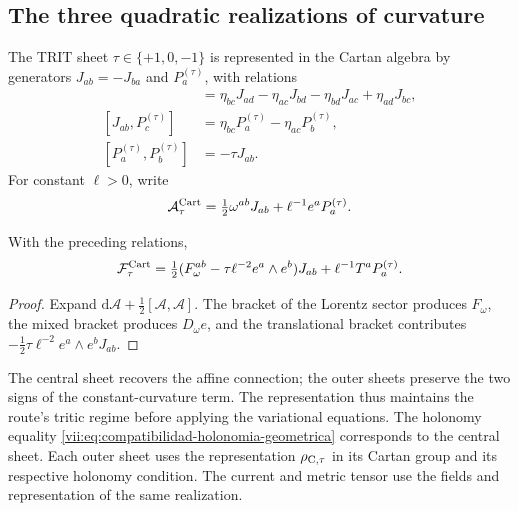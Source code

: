 \subsection{The three quadratic realizations of curvature}

The TRIT sheet \(\tau\in\{+1,0,-1\}\) is represented in
the Cartan algebra by generators \(J_{ab}=-J_{ba}\)
and \(P_a^{(\tau)}\), with relations
\begin{align*}
 [J_{ab},J_{cd}]&=
 \eta_{bc}J_{ad}-\eta_{ac}J_{bd}
 -\eta_{bd}J_{ac}+\eta_{ad}J_{bc},\\
 [J_{ab},P_c^{(\tau)}]&=
 \eta_{bc}P_a^{(\tau)}-\eta_{ac}P_b^{(\tau)},\\
 [P_a^{(\tau)},P_b^{(\tau)}]&=-\tau J_{ab}.
\end{align*}
For constant \(\ell>0\), write
\[
 \mathcal A_\tau^{\rm Cart}
 =\tfrac12\omega^{ab}J_{ab}+\ell^{-1}e^aP_a^{(\tau)}.
\]

\begin{proposition}
\label{vii:prop:curvatura-tritificada}
With the preceding relations,
\begin{equation}
 \mathcal F_\tau^{\rm Cart}
 =\tfrac12(F_\omega^{ab}-\tau\ell^{-2}e^a\wedge e^b)J_{ab}
     +\ell^{-1}T^aP_a^{(\tau)}.
 \label{vii:eq:curvatura-tritificada}
\end{equation}
\end{proposition}
\begin{proof}
Expand \(\mathrm d\mathcal A+\tfrac12[\mathcal A,\mathcal A]\).
The bracket of the Lorentz sector produces \(F_\omega\), the
mixed bracket produces \(D_\omega e\), and the translational bracket contributes
\(-\tfrac12\tau\ell^{-2}e^a\wedge e^bJ_{ab}\).
\end{proof}

The central sheet recovers the affine connection; the outer sheets
preserve the two signs of the constant-curvature term.
The representation thus maintains the route's tritic regime before
applying the variational equations. The holonomy equality
\eqref{vii:eq:compatibilidad-holonomia-geometrica} corresponds to the
central sheet. Each outer sheet uses the representation
\(\rho_{{\rm C},\tau}\) in its Cartan group and its respective
holonomy condition. The current and metric tensor use
the fields and representation of the same realization.
